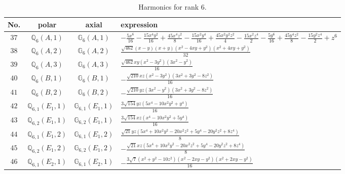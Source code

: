 \documentclass[fleqn,8pt,landscape]{jsarticle}
\begin{document}
\begin{table}[ht!]
\begin{center}
\caption{Harmonics for rank 6.}
\renewcommand{\arraystretch}{1.3}
\begin{tabular}{cccl} \hline \hline
No. & polar & axial & expression \\ \hline
$ 37 $ & $ \mathbb{Q}_{6}(A,1) $ & $ \mathbb{G}_{6}(A,1) $ & $ - \frac{5 x^{6}}{16} - \frac{15 x^{4} y^{2}}{16} + \frac{45 x^{4} z^{2}}{8} - \frac{15 x^{2} y^{4}}{16} + \frac{45 x^{2} y^{2} z^{2}}{4} - \frac{15 x^{2} z^{4}}{2} - \frac{5 y^{6}}{16} + \frac{45 y^{4} z^{2}}{8} - \frac{15 y^{2} z^{4}}{2} + z^{6} $ \\
$ 38 $ & $ \mathbb{Q}_{6}(A,2) $ & $ \mathbb{G}_{6}(A,2) $ & $ \frac{\sqrt{462} \left(x - y\right) \left(x + y\right) \left(x^{2} - 4 x y + y^{2}\right) \left(x^{2} + 4 x y + y^{2}\right)}{32} $ \\
$ 39 $ & $ \mathbb{Q}_{6}(A,3) $ & $ \mathbb{G}_{6}(A,3) $ & $ \frac{\sqrt{462} x y \left(x^{2} - 3 y^{2}\right) \left(3 x^{2} - y^{2}\right)}{16} $ \\
$ 40 $ & $ \mathbb{Q}_{6}(B,1) $ & $ \mathbb{G}_{6}(B,1) $ & $ - \frac{\sqrt{210} x z \left(x^{2} - 3 y^{2}\right) \left(3 x^{2} + 3 y^{2} - 8 z^{2}\right)}{16} $ \\
$ 41 $ & $ \mathbb{Q}_{6}(B,2) $ & $ \mathbb{G}_{6}(B,2) $ & $ - \frac{\sqrt{210} y z \left(3 x^{2} - y^{2}\right) \left(3 x^{2} + 3 y^{2} - 8 z^{2}\right)}{16} $ \\
$ 42 $ & $ \mathbb{Q}_{6,1}(E_{1},1) $ & $ \mathbb{G}_{6,1}(E_{1},1) $ & $ \frac{3 \sqrt{154} y z \left(5 x^{4} - 10 x^{2} y^{2} + y^{4}\right)}{16} $ \\
$ 43 $ & $ \mathbb{Q}_{6,2}(E_{1},1) $ & $ \mathbb{G}_{6,2}(E_{1},1) $ & $ \frac{3 \sqrt{154} x z \left(x^{4} - 10 x^{2} y^{2} + 5 y^{4}\right)}{16} $ \\
$ 44 $ & $ \mathbb{Q}_{6,1}(E_{1},2) $ & $ \mathbb{G}_{6,1}(E_{1},2) $ & $ \frac{\sqrt{21} y z \left(5 x^{4} + 10 x^{2} y^{2} - 20 x^{2} z^{2} + 5 y^{4} - 20 y^{2} z^{2} + 8 z^{4}\right)}{8} $ \\
$ 45 $ & $ \mathbb{Q}_{6,2}(E_{1},2) $ & $ \mathbb{G}_{6,2}(E_{1},2) $ & $ - \frac{\sqrt{21} x z \left(5 x^{4} + 10 x^{2} y^{2} - 20 x^{2} z^{2} + 5 y^{4} - 20 y^{2} z^{2} + 8 z^{4}\right)}{8} $ \\
$ 46 $ & $ \mathbb{Q}_{6,1}(E_{2},1) $ & $ \mathbb{G}_{6,1}(E_{2},1) $ & $ - \frac{3 \sqrt{7} \left(x^{2} + y^{2} - 10 z^{2}\right) \left(x^{2} - 2 x y - y^{2}\right) \left(x^{2} + 2 x y - y^{2}\right)}{16} $ \\

\end{tabular}
\end{center}
\end{table}
\end{document}
